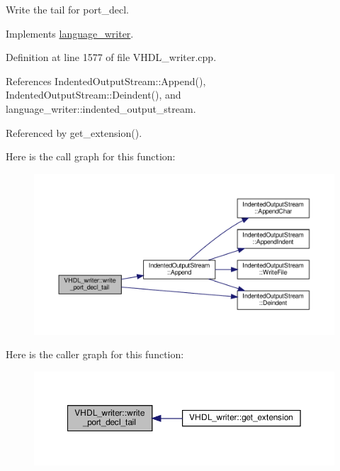Write the tail for port\+\_\+decl. 



Implements \hyperlink{classlanguage__writer_af20577675f401b5e75b4f0a64484529b}{language\+\_\+writer}.



Definition at line 1577 of file V\+H\+D\+L\+\_\+writer.\+cpp.



References Indented\+Output\+Stream\+::\+Append(), Indented\+Output\+Stream\+::\+Deindent(), and language\+\_\+writer\+::indented\+\_\+output\+\_\+stream.



Referenced by get\+\_\+extension().

Here is the call graph for this function\+:
\nopagebreak
\begin{figure}[H]
\begin{center}
\leavevmode
\includegraphics[width=350pt]{d0/d0c/structVHDL__writer_af421fa8d57e933193276a0cb76ccd0a3_cgraph}
\end{center}
\end{figure}
Here is the caller graph for this function\+:
\nopagebreak
\begin{figure}[H]
\begin{center}
\leavevmode
\includegraphics[width=350pt]{d0/d0c/structVHDL__writer_af421fa8d57e933193276a0cb76ccd0a3_icgraph}
\end{center}
\end{figure}
\mbox{\label{structVHDL__writer_a2d88694c56cecd9e97117da37c3cf0d3}} 
